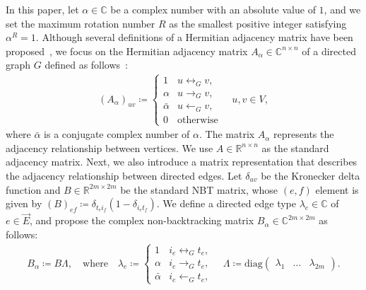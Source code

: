 \documentclass{article}
\theoremstyle{plain}
\begin{document}
In this paper, let $\alpha \in \mathbb{C}$ be a complex number with an absolute value of $1$,
and we set the maximum rotation number $R$ as the smallest positive integer satisfying $\alpha^R = 1$.
Although several definitions of a Hermitian adjacency matrix have been proposed~\citep{Guo2017-or,Liu2015-qu,Mohar2020-fa,Martin2024-en},
we focus on the Hermitian adjacency matrix $A_{\alpha} \in \mathbb{C}^{n\times n}$ of a directed graph $G$ defined as follows~\citep{Guo2017-or,Liu2015-qu}:
\begin{align}
	\left( A_{\alpha} \right)_{uv} \coloneqq \begin{cases}
		                                         1            & u \leftrightarrow_{G} v
		                                         ,                                      \\
		                                         \alpha       & u\rightarrow_{G} v
		                                         ,                                      \\
		                                         \bar{\alpha} & u\leftarrow_{G} v
		                                         ,                                      \\
		                                         0            & \text{otherwise}
	                                         \end{cases}
	\quad u,v \in V
	,\label{definition:A_alpha}
\end{align}
where $\bar{\alpha}$ is a conjugate complex number of $\alpha$.
The matrix $A_{\alpha}$ represents the adjacency relationship between vertices.
We use $A \in \mathbb{R}^{n\times n}$ as the standard adjacency matrix.
Next, we also introduce a matrix representation that describes the adjacency relationship between directed edges.
Let $\delta_{uv}$ be the Kronecker delta function and
$B \in \mathbb{R}^{2m\times 2m}$ be the standard NBT matrix,
whose $(e,f)$ element is given by $(B)_{ef} \coloneqq \delta_{t_e i_f} (1 - \delta_{i_e t_f})$.
We define a directed edge type $\lambda_e \in \mathbb{C}$ of $e \in \vec{E}$, and propose the complex non-backtracking matrix $B_{\alpha} \in \mathbb{C}^{2m\times 2m}$ as follows:
\begin{align}
	B_{\alpha} \coloneqq B \Lambda
	,\quad \text{where}\quad
	\lambda_e  \coloneqq \begin{cases}
		                     1            & i_e \leftrightarrow_{G} t_e
		                     ,                                          \\
		                     \alpha       & i_e \rightarrow_{G} t_e
		                     ,                                          \\
		                     \bar{\alpha} & i_e \leftarrow_{G} t_e
		                     ,
	                     \end{cases}
	\quad
	\Lambda    \coloneqq \text{diag}\begin{pmatrix}
		                                \lambda_1 & \dots & \lambda_{2m}
	                                \end{pmatrix}
	.\label{definition:B_alpha}
\end{align}
\end{document}
